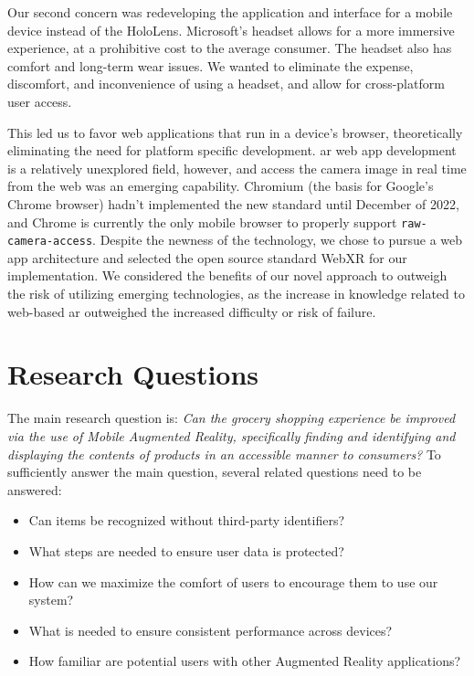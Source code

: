 \documentclass[thesis]{fputhesis}
\begin{document}
\begin{body}
Our second concern was redeveloping the application and interface for a mobile device instead of the HoloLens. Microsoft's headset allows for a more immersive experience, at a prohibitive cost to the average consumer. The headset also has comfort and long-term wear issues. We wanted to eliminate the expense, discomfort, and inconvenience of using a headset, and allow for cross-platform user access. 

This led us to favor web applications that run in a device's browser, theoretically eliminating the need for platform specific development. \acrfull{ar} web app development is a relatively unexplored field, however, and access the camera image in real time from the web was an emerging capability. Chromium (the basis for Google's Chrome browser) hadn't implemented the new standard until December of 2022, and Chrome is currently the only mobile browser to properly support \verb|raw-camera-access|. Despite the newness of the technology, we chose to pursue a web app architecture and selected the open source standard WebXR for our implementation.  We considered the benefits of our novel approach to outweigh the risk of utilizing emerging technologies, as the increase in knowledge related to web-based \acrshort{ar} outweighed the increased difficulty or risk of failure.
\filbreak
\section{Research Questions}
The main research question is: \textit{Can the grocery shopping experience be improved via the use of Mobile Augmented Reality, specifically finding and identifying and displaying the contents of products in an accessible manner to consumers?}
To sufficiently answer the main question, several related questions need to be answered:
\begin{itemize}
    \item Can items be recognized without third-party identifiers?
    \item What steps are needed to ensure user data is protected?
    \item How can we maximize the comfort of users to encourage them to use our system?
    \item What is needed to ensure consistent performance across devices?
    \item How familiar are potential users with other Augmented Reality applications?
\end{itemize}

\end{body}
\end{document}
